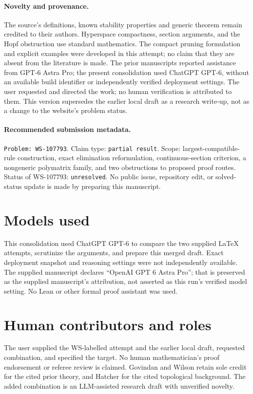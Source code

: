 \documentclass[11pt]{article}
\theoremstyle{definition}
\begin{document}
\paragraph{Novelty and provenance.}
The source's definitions, known stability properties and generic theorem
remain credited to their authors. Hyperspace compactness, section arguments,
and the Hopf obstruction use standard mathematics. The compact pruning
formulation and explicit examples were developed in this attempt; no claim
that they are absent from the literature is made. The prior manuscripts reported assistance from GPT-6 Astra Pro;
the present consolidation used ChatGPT GPT-6, without an available build
identifier or independently verified deployment settings. The user requested
and directed the work; no human verification is attributed to them.
This version supersedes the earlier local draft as a research write-up,
not as a change to the website's problem status.

\paragraph{Recommended submission metadata.}
\texttt{Problem: WS-107793}. Claim type: \texttt{partial result}.
Scope: largest-compatible-rule construction, exact elimination reformulation,
continuous-section criterion, a nongeneric polymatrix family, and two
obstructions to proposed proof routes. Status of WS-107793: \texttt{unresolved}.
No public issue, repository edit, or solved-status update is made by preparing
this manuscript.

\section*{Models used}
This consolidation used ChatGPT GPT-6 to compare the two supplied
LaTeX attempts, scrutinize the arguments, and prepare this merged draft.
Exact deployment snapshot and reasoning settings were not independently
available. The supplied manuscript declares ``OpenAI GPT 6 Astra Pro'';
that is preserved as the supplied manuscript's attribution, not asserted
as this run's verified model setting. No Lean or other formal proof
assistant was used.

\section*{Human contributors and roles}
The user supplied the WS-labelled attempt and the earlier local draft,
requested combination, and specified the target. No human mathematician's
proof endorsement or referee review is claimed. Govindan and Wilson
retain sole credit for the cited prior theory, and Hatcher for the cited
topological background. The added combination is an LLM-assisted research
draft with unverified novelty.
\end{document}

